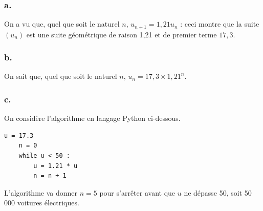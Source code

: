	\subsubsection*{a.}
	
	On a vu que, quel que soit le naturel \(n\), \(u_{n+1} = 1,21u_n\) : ceci montre que la suite \((u_n)\) est une suite géométrique de raison 1,21 et de premier terme \(17,3\).
	
	\subsubsection*{b.}
	
	On sait que, quel que soit le naturel \(n\), \(u_n = 17,3 \times 1,21^n\).
	
	\subsubsection*{c.}
	
	On considère l'algorithme en langage Python ci-dessous.
	
	\begin{lstlisting}[style=python]
	u = 17.3
	n = 0
	while u < 50 :
		u = 1.21 * u
		n = n + 1
	\end{lstlisting}
	
	L'algorithme va donner \(n = 5\) pour s'arrêter avant que \(u\) ne dépasse 50, soit 50 000 voitures électriques.

